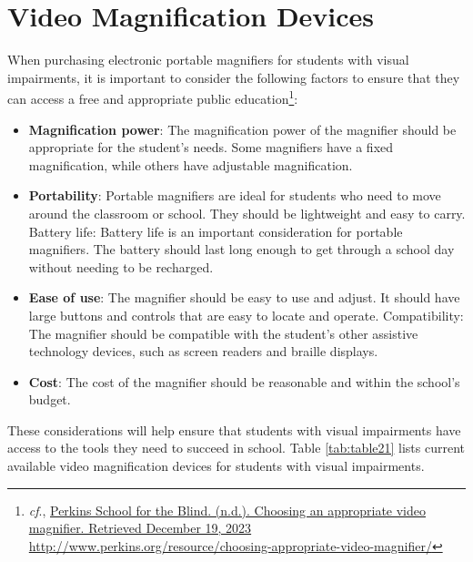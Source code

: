 \documentclass[12pt,letterpaper,twoside]{extreport}
\begin{document}
\pagebreak\hypertarget{video-magnification-devices}{}\section{Video Magnification
  Devices}\label{video-magnification-devices}
When purchasing electronic portable magnifiers for students with visual impairments, it is important to consider the following factors to ensure that they can access a free and appropriate public education\footnote{\raggedright \textit{cf}., \href{http://www.perkins.org/resource/choosing-appropriate-video-magnifier/}{Perkins School for the Blind. (n.d.). Choosing an appropriate video magnifier. Retrieved December 19, 2023} \url{http://www.perkins.org/resource/choosing-appropriate-video-magnifier/}}:
\begin{itemize}[leftmargin=*]
\item \textbf{Magnification power}: The magnification power of the magnifier should be appropriate for the student’s needs. Some magnifiers have a fixed magnification, while others have adjustable magnification.
\item \textbf{Portability}: Portable magnifiers are ideal for students who need to move around the classroom or school. They should be lightweight and easy to carry.
Battery life: Battery life is an important consideration for portable magnifiers. The battery should last long enough to get through a school day without needing to be recharged.
\item \textbf{Ease of use}: The magnifier should be easy to use and adjust. It should have large buttons and controls that are easy to locate and operate.
Compatibility: The magnifier should be compatible with the student’s other assistive technology devices, such as screen readers and braille displays.
\item \textbf{Cost}: The cost of the magnifier should be reasonable and within the school’s budget.
\end{itemize}
These considerations will help ensure that students with visual impairments have access to the tools they need to succeed in school. Table \ref{tab:table21} lists current available video magnification devices for students with visual impairments.
\end{document}
